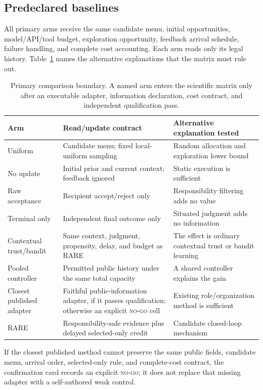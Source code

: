 \documentclass[sigconf,anonymous]{aamas}
\begin{document}
\subsection{Predeclared baselines}
All primary arms receive the same candidate menu, initial opportunities, model/API/tool budget, exploration opportunity, feedback arrival schedule, failure handling, and complete cost accounting. Each arm reads only its legal history. Table~\ref{tab:baselines} names the alternative explanations that the matrix must rule out.
\begin{table}[t]
\centering\small
\begin{tabular}{p{}p{}p{}}
\toprule
Arm & Read/update contract & Alternative explanation tested\\
\midrule
Uniform & Candidate menu; fixed local-uniform sampling & Random allocation and exploration lower bound\\
No update & Initial prior and current context; feedback ignored & Static execution is sufficient\\
Raw acceptance & Recipient accept/reject only & Responsibility filtering adds no value\\
Terminal only & Independent final outcome only & Situated judgment adds no information\\
Contextual trust/bandit & Same context, judgment, propensity, delay, and budget as RARE & The effect is ordinary contextual trust or bandit learning\\
Pooled controller & Permitted public history under the same total capacity & A shared controller explains the gain\\
Closest published adapter & Faithful public-information adapter, if it passes qualification; otherwise an explicit \textsc{no-go} cell & Existing role/organization method is sufficient\\
RARE & Responsibility-safe evidence plus delayed selected-only credit & Candidate closed-loop mechanism\\
\bottomrule
\end{tabular}
\caption{Primary comparison boundary. A named arm enters the scientific matrix only after an executable adapter, information declaration, cost contract, and independent qualification pass.}
\label{tab:baselines}
\end{table}

If the closest published method cannot preserve the same public fields, candidate menu,
arrival order, selected-only rule, and complete-cost contract, the confirmation card records
an explicit \textsc{no-go}; it does not replace that missing adapter with a self-authored
weak control.
\end{document}
